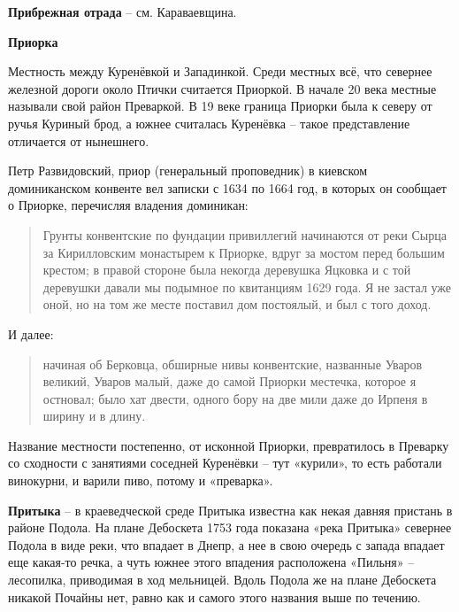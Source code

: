 \medskip

\textbf{Прибрежная отрада} – см. Караваевщина.\\

\medskip


\textbf{Приорка}

Местность между Куренёвкой и Западинкой. Среди местных всё, что севернее железной дороги около Птички считается Приоркой. В начале 20 века местные называли свой район Преваркой. В 19 веке граница Приорки была к северу от ручья Куриный брод, а южнее считалась Куренёвка – такое представление отличается от нынешнего. 

Петр Развидовский, приор (генеральный проповедник) в киевском доминиканском конвенте вел записки с 1634 по 1664 год, в которых он сообщает о Приорке, перечисляя владения доминикан:

\begin{quotation}
Грунты конвентские по фундации привиллегий начинаются от реки Сырца за Кирилловским монастырем к Приорке, вдруг за мостом перед большим крестом; в правой стороне была некогда деревушка Яцковка и с той деревушки давали мы подымное по квитанциям 1629 года. Я не застал уже оной, но на том же месте поставил дом постоялый, и был с того доход.
\end{quotation}

И далее:

\begin{quotation}
начиная об Берковца, обширные нивы конвентские, названные Уваров великий, Уваров малый, даже до самой Приорки местечка, которое я остновал; было хат двести, одного бору на две мили даже до Ирпеня в ширину и в длину.
\end{quotation}

Название местности постепенно, от исконной Приорки, превратилось в Преварку со сходности с занятиями соседней Куренёвки – тут «курили», то есть работали винокурни, и варили пиво, потому и «преварка».\\

\medskip

\textbf{Притыка} – в краеведческой среде Притыка известна как некая давняя пристань в районе Подола. На плане Дебоскета 1753 года показана «река Притыка» севернее Подола в виде реки, что впадает в Днепр, а нее в свою очередь с запада впадает еще какая-то речка, а чуть южнее этого впадения расположена «Пильня» – лесопилка, приводимая в ход мельницей. Вдоль Подола же на плане Дебоскета никакой Почайны нет, равно как и самого этого названия выше по течению.\\ 

